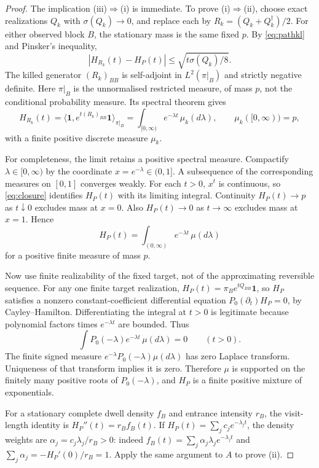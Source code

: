 \documentclass[11pt,a4paper]{article}
\newcommand{\one}{\mathbf 1}
\newcommand{\sig}{\sigma}
\begin{document}
\begin{proof}
The implication (iii)$\Rightarrow$(i) is immediate. To prove (i)$\Rightarrow$(ii), choose exact realizations $Q_k$ with $\sig(Q_k)\to0$, and replace each by $R_k=(Q_k+Q_k^\dagger)/2$. For either observed block $B$, the stationary mass is the same fixed $p$. By \eqref{eq:pathkl} and Pinsker's inequality,
\begin{equation}\label{eq:closure}
 |H_{R_k}(t)-H_P(t)|\leq\sqrt{t\sig(Q_k)/8}.
\end{equation}
The killed generator $(R_k)_{BB}$ is self-adjoint in $L^2(\pi|_B)$ and strictly negative definite. Here $\pi|_B$ is the unnormalised restricted measure, of mass $p$, not the conditional probability measure. Its spectral theorem gives
\[
 H_{R_k}(t)=\langle\one,e^{t(R_k)_{BB}}\one\rangle_{\pi|_B}
 =\int_{[0,\infty)}e^{-\lambda t}\,\mu_k(d\lambda),
 \qquad \mu_k([0,\infty))=p,
\]
with a finite positive discrete measure $\mu_k$.

For completeness, the limit retains a positive spectral measure. Compactify $\lambda\in[0,\infty)$ by the coordinate $x=e^{-\lambda}\in(0,1]$. A subsequence of the corresponding measures on $[0,1]$ converges weakly. For each $t>0$, $x^t$ is continuous, so \eqref{eq:closure} identifies $H_P(t)$ with its limiting integral. Continuity $H_P(t)\to p$ as $t\downarrow0$ excludes mass at $x=0$. Also $H_P(t)\to0$ as $t\to\infty$ excludes mass at $x=1$. Hence
\[
 H_P(t)=\int_{(0,\infty)}e^{-\lambda t}\,\mu(d\lambda)
\]
for a positive finite measure of mass $p$.

Now use finite realizability of the fixed target, not of the approximating reversible sequence. For any one finite target realization, $H_P(t)=\pi_Be^{tQ_{BB}}\one$, so $H_P$ satisfies a nonzero constant-coefficient differential equation $P_0(\partial_t)H_P=0$, by Cayley--Hamilton. Differentiating the integral at $t>0$ is legitimate because polynomial factors times $e^{-\lambda t}$ are bounded. Thus
\[
 \int P_0(-\lambda)e^{-\lambda t}\,\mu(d\lambda)=0\qquad(t>0).
\]
The finite signed measure $e^{-\lambda}P_0(-\lambda)\mu(d\lambda)$ has zero Laplace transform. Uniqueness of that transform implies it is zero. Therefore $\mu$ is supported on the finitely many positive roots of $P_0(-\lambda)$, and $H_P$ is a finite positive mixture of exponentials.

For a stationary complete dwell density $f_B$ and entrance intensity $r_B$, the visit-length identity is $H_P''(t)=r_B f_B(t)$. If $H_P(t)=\sum_j c_j e^{-\lambda_jt}$, the density weights are $\alpha_j=c_j\lambda_j/r_B>0$: indeed $f_B(t)=\sum_j\alpha_j\lambda_j e^{-\lambda_jt}$ and $\sum_j\alpha_j=-H_P'(0)/r_B=1$. Apply the same argument to $A$ to prove (ii).


\end{proof}
\end{document}
